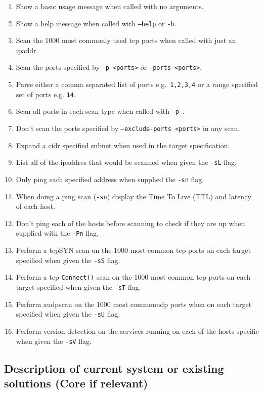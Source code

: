 \documentclass[titlepage]{article}
\let\Oldsubsection\subsection{}
\renewcommand{\subsection}{\FloatBarrier\Oldsubsection}
\begin{document}
\begin{enumerate}
\item{Show a basic usage message when called with no arguments.}
\item{Show a help message when called with \texttt{--help} or \texttt{-h}.}
\item{Scan the 1000 most commonly used \gls{tcp} \glspl{port} when called with just an \gls{ipaddr}.}
\item{Scan the \glspl{port} specified by \texttt{-p <ports>} or \texttt{--ports <ports>}.}
\item{Parse either a comma separated list of \glspl{port} e.g.\ \texttt{1,2,3,4} or a range specified set of \glspl{port} e.g.
  \texttt{1{\textendash}4}}.
\item{Scan all \glspl{port} in each scan type when called with \texttt{-p-}.}
\item{Don't scan the \glspl{port} specified by \texttt{--exclude-ports <ports>} in any scan.}
\item{Expand a \gls{cidr} specified \gls{subnet} when used in the target specification.}
\item{List all of the \gls{ipaddr}es that would be scanned when given the \texttt{-sL} flag.}
\item{Only ping each specified address when supplied the \texttt{-sn} flag.}
\item{When doing a ping scan (\texttt{-sn}) display the Time To Live (TTL) and latency of each host.}
\item{Don't ping each of the hosts before scanning to check if they are up when supplied with the \texttt{-Pn} flag.}
\item{Perform a \gls{tcp}SYN scan on the 1000 most common \gls{tcp} \glspl{port} on each target specified when given the \texttt{-sS} flag.}
\item{Perform a \gls{tcp} \verb|Connect()| scan on the 1000 most common \gls{tcp} \glspl{port} on each target specified when given the \texttt{-sT} flag.}
\item{Perform a\gls{udp}scan on the 1000 most common\gls{udp} \glspl{port} when on each target specified when given the \texttt{-sU} flag.}
\item{Perform version detection on the \glspl{service} running on each of the hosts specific when given the \texttt{-sV} flag.}
\end{enumerate}

\subsection{Description of current system or existing solutions (Core if relevant)}
\end{document}
